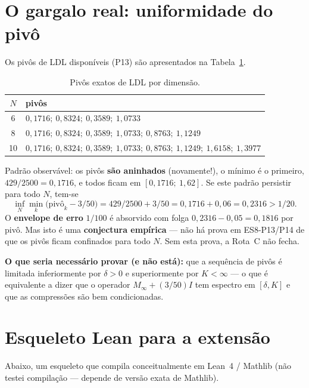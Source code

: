 \documentclass[11pt,a4paper]{article}
\theoremstyle{definition}
\theoremstyle{remark}
\begin{document}
\section{O gargalo real: uniformidade do pivô}

Os pivôs de LDL disponíveis (P13) são apresentados na Tabela~\ref{tab:pivos}.

\begin{table}[h!]
\centering
\begin{tabular}{c l}
\toprule
\(N\) & pivôs \\
\midrule
6  & \(0{,}1716;\ 0{,}8324;\ 0{,}3589;\ 1{,}0733\) \\
8  & \(0{,}1716;\ 0{,}8324;\ 0{,}3589;\ 1{,}0733;\ 0{,}8763;\ 1{,}1249\) \\
10 & \(0{,}1716;\ 0{,}8324;\ 0{,}3589;\ 1{,}0733;\ 0{,}8763;\ 1{,}1249;\ 1{,}6158;\ 1{,}3977\) \\
\bottomrule
\end{tabular}
\caption{Pivôs exatos de LDL por dimensão.}
\label{tab:pivos}
\end{table}

Padrão observável: os pivôs \textbf{são aninhados} (novamente!), o mínimo é o
primeiro, \(429/2500 = 0{,}1716\), e todos ficam em
\([0{,}1716;\ 1{,}62]\). Se este padrão persistir para todo \(N\), tem-se
\[
\inf_N \min_k \bigl(\text{pivô}_k - 3/50\bigr)
= 429/2500 + 3/50
= 0{,}1716 + 0{,}06
= 0{,}2316 > 1/20.
\]
O \textbf{envelope de erro} \(1/100\) é absorvido com folga
\(0{,}2316 - 0{,}05 = 0{,}1816\) por pivô. Mas isto é uma \textbf{conjectura
empírica} --- não há prova em ES8-P13/P14 de que os pivôs ficam confinados
para todo \(N\). Sem esta prova, a Rota~C não fecha.

\textbf{O que seria necessário provar (e não está):} que a sequência de pivôs
é limitada inferiormente por \(\delta > 0\) e superiormente por \(K<\infty\)
--- o que é equivalente a dizer que o operador \(M_\infty + (3/50)I\) tem
espectro em \([\delta,K]\) e que as compressões são bem condicionadas.

\section{Esqueleto Lean para a extensão}

Abaixo, um esqueleto que compila conceitualmente em Lean~4 / Mathlib (não
testei compilação --- depende de versão exata de Mathlib).
\end{document}
